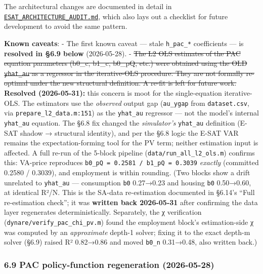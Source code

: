 \documentclass[
]{article}
\begin{document}
The architectural changes are documented in detail in
\href{../ESAT_ARCHITECTURE_AUDIT.md}{\texttt{ESAT\_ARCHITECTURE\_AUDIT.md}},
which also lays out a checklist for future development to avoid the same
pattern.

\textbf{Known caveats}: - The first known caveat --- stale
\texttt{h\_pac\_*} coefficients --- is \textbf{resolved in §6.9 below}
(2026-05-28). - \st{The L2 OLS estimates of the PAC equation parameters
(b0\_c, b1\_c, b0\_pQ, etc.) were obtained using the OLD
\mbox{\texttt{yhat\_au}} as a regressor in the iterative-OLS procedure.
They are not formally re-optimal under the new structural definition. A
re-fit is left for future work.} \textbf{Resolved (2026-05-31):} this
concern is moot for the single-equation iterative-OLS. The estimators
use the \emph{observed} output gap (\texttt{au\_ygap} from
\texttt{dataset.csv}, via \texttt{prepare\_l2\_data.m:151}) as the
\texttt{yhat\_au} regressor --- not the model's internal
\texttt{yhat\_au} equation. The §6.8 fix changed the \emph{simulator's}
\texttt{yhat\_au} definition (E-SAT shadow → structural identity), and
per the §6.8 logic the E-SAT VAR remains the expectation-forming tool
for the PV term; neither estimation input is affected. A full re-run of
the 5-block pipeline (\texttt{data/run\_all\_l2\_ols.m}) confirms this:
VA-price reproduces \texttt{b0\_pQ\ =\ 0.2581\ /\ b1\_pQ\ =\ 0.3039}
\emph{exactly} (committed 0.2580 / 0.3039), and employment is within
rounding. (Two blocks show a drift unrelated to \texttt{yhat\_au} ---
consumption \texttt{b0} 0.27→0.23 and housing \texttt{b0} 0.50→0.60, at
identical R²/N. This is the SA-data re-estimation documented in §6.14's
``Full re-estimation check''; it was \textbf{written back 2026-05-31}
after confirming the data layer regenerates deterministically.
Separately, the χ verification (\texttt{dynare/verify\_pac\_chi\_pv.m})
found the employment block's estimation-side χ was computed by an
\emph{approximate} depth-1 solver; fixing it to the exact depth-m solver
(§6.9) raised R² 0.82→0.86 and moved \texttt{b0\_n} 0.31→0.48, also
written back.)

\subsubsection{6.9 PAC policy-function regeneration
(2026-05-28)}\label{pac-policy-function-regeneration-2026-05-28}
\end{document}
